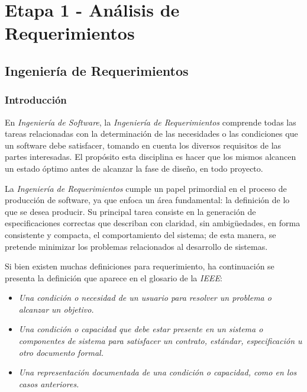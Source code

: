 \documentclass[11pt,oneside]{book}
\begin{document}
\clearpage
\newpage

\section{Etapa 1 - Análisis de Requerimientos}

\subsection{Ingeniería de Requerimientos}
\subsubsection{Introducción}
En \textit{Ingeniería de Software}, la \textit{Ingeniería de Requerimientos} comprende todas las tareas relacionadas con la determinación de las necesidades o las condiciones que un software debe satisfacer, tomando en cuenta los diversos requisitos de las partes interesadas. El propósito esta disciplina es hacer que los mismos alcancen un estado óptimo antes de alcanzar la fase de diseño, en todo proyecto.

La \textit{Ingeniería de Requerimientos} cumple un papel primordial en el proceso de producción de software, ya que enfoca un área fundamental: la definición de lo que se desea producir. Su principal tarea consiste en la generación de especificaciones correctas que describan con claridad, sin ambigüedades, en forma consistente y compacta, el comportamiento del sistema; de esta manera, se pretende minimizar los problemas relacionados al desarrollo de sistemas.

Si bien existen muchas definiciones para requerimiento, ha continuación se presenta la definición que aparece en el glosario de la \textit{IEEE}:

\begin{itemize}
\item \textit{Una condición o necesidad de un usuario para resolver un problema o alcanzar un objetivo.}
\item \textit{Una condición o capacidad que debe estar presente en un sistema o componentes de sistema para satisfacer un contrato, estándar, especificación u otro documento formal.}
\item \textit{Una representación documentada de una condición o capacidad, como en los casos anteriores.}
\end{itemize}
\end{document}
